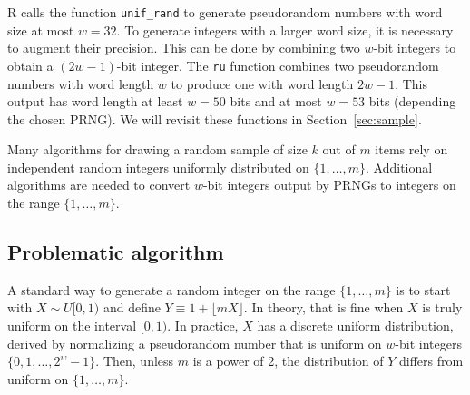 \documentclass[12pt]{article}
\begin{document}
R calls the function \texttt{unif\_rand} to generate pseudorandom numbers with word size at most $w=32$.
To generate integers with a larger word size, it is necessary to augment their precision.
This can be done by combining two $w$-bit integers to obtain a $(2w-1)$-bit integer.
The \texttt{ru} function combines two pseudorandom numbers with word length $w$ to produce one with word length $2w - 1$.
This output has word length at least $w=50$ bits and at most $w=53$ bits (depending the chosen PRNG). 
We will revisit these functions in Section~\ref{sec:sample}.

Many algorithms for drawing a random sample of size $k$ out of $m$ items
 rely on independent random integers uniformly distributed on $\{1, \dots, m\}$.
Additional algorithms are needed to convert $w$-bit integers output by PRNGs to integers on the range $\{1, \dots, m\}$.

\subsection{Problematic algorithm}\label{sec:flawed}
A standard way to generate a random integer on the range $\{1, \dots, m\}$ is to start with $X \sim U[0,1)$ and define $Y \equiv 1 + \lfloor mX \rfloor$. 
In theory, that is fine when $X$ is truly uniform on the interval $[0,1)$.
In practice, $X$ has a discrete uniform distribution, derived by normalizing a pseudorandom number that is uniform on $w$-bit integers $\{0, 1, \ldots, 2^w - 1\}$.
Then, unless $m$ is a power of 2, the distribution of $Y$ differs from uniform on $\{1, \ldots, m\}$. 
\end{document}
